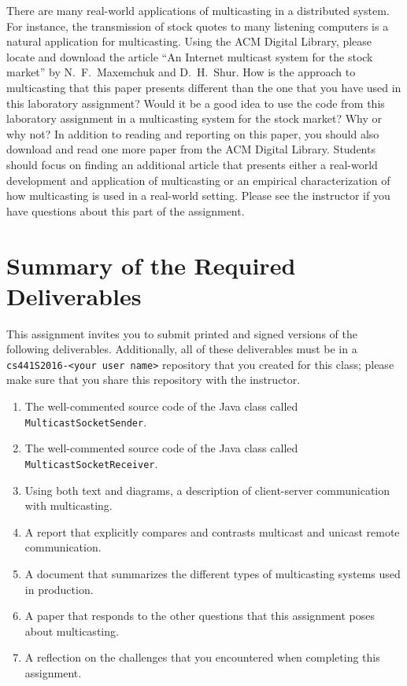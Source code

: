 There are many real-world applications of multicasting in a distributed system. For instance, the transmission of stock
quotes to many listening computers is a natural application for multicasting. Using the ACM Digital Library, please
locate and download the article ``An Internet multicast system for the stock market'' by N.\ F.\ Maxemchuk and D.\ H.\
Shur. How is the approach to multicasting that this paper presents different than the one that you have used in this
laboratory assignment? Would it be a good idea to use the code from this laboratory assignment in a multicasting system
for the stock market? Why or why not? In addition to reading and reporting on this paper, you should also download and
read one more paper from the ACM Digital Library. Students should focus on finding an additional article that presents
either a real-world development and application of multicasting or an empirical characterization of how multicasting is
used in a real-world setting. Please see the instructor if you have questions about this part of the assignment.

\section*{Summary of the Required Deliverables}

This assignment invites you to submit printed and signed versions of the following deliverables. Additionally,
all of these deliverables must be in a {\tt cs441S2016-<your user name>} repository that you created for this class;
please make sure that you share this repository with the instructor.

\vspace*{-.1in}

\begin{enumerate}
  \itemsep 0em

  \item The well-commented source code of the Java class called {\tt MulticastSocketSender}.

  \item The well-commented source code of the Java class called {\tt MulticastSocketReceiver}.

  \item Using both text and diagrams, a description of client-server communication with multicasting.

  \item A report that explicitly compares and contrasts multicast and unicast remote communication.

  \item A document that summarizes the different types of multicasting systems used in production.

  \item A paper that responds to the other questions that this assignment poses about multicasting.

  \item A reflection on the challenges that you encountered when completing this assignment.

\end{enumerate}

